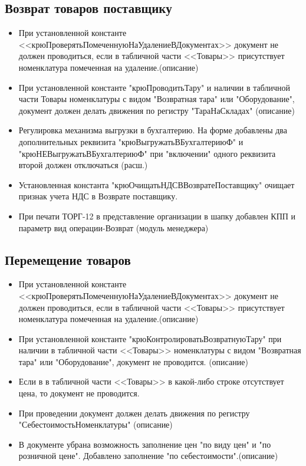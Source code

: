 \subsection{Возврат товаров поставщику}
\begin{itemize}
	\item При установленной константе <<крюПроверятьПомеченнуюНаУдалениеВДокументах>>
	документ не должен проводиться, если в табличной части <<Товары>> присутствует
	номенклатура помеченная на удаление.(описание)
	\item При установленной константе "крюПроводитьТару" и наличии в табличной части
	 Товары номенклатуры	с видом "Возвратная тара" или "Оборудование", документ должен делать движения по регистру "ТараНаСкладах" (описание)
	\item  Регулировка механизма выгрузки в бухгалтерию. На форме добавлены два дополнительных реквизита "крюВыгружатьВБухгалтериюФ" и "крюНЕВыгружатьВБухгалтериюФ" при "включении" одного реквизита второй должен отключаться
	 (расш.)
	\item Установленная константа "крюОчищатьНДСВВозвратеПоставщику" очищает признак учета НДС в Возврате поставщику.
	\item При печати ТОРГ-12 в представление организации в шапку добавлен КПП и параметр вид операции-Возврат (модуль менеджера)

\end{itemize}


\subsection{Перемещение товаров}

\begin{itemize}
	\item При установленной константе <<крюПроверятьПомеченнуюНаУдалениеВДокументах>>
	документ не должен проводиться, если в табличной части <<Товары>> присутствует
	номенклатура помеченная на удаление.(описание)
	\item При установленной константе "крюКонтролироватьВозвратнуюТару" при наличии в табличной части <<Товары>> номенклатуры
	с видом "Возвратная тара" или "Оборудование", документ не проводится. (описание)
	\item Если в в табличной части <<Товары>> в какой-либо строке отсутствует цена, то документ не проводится.
	\item При проведении документ должен делать движения по регистру "СебестоимостьНоменклатуры" (описание)
	\item В документе убрана возможность заполнение цен "по виду цен" и "по розничной цене". Добавлено заполнение "по себестоимости".(описание)
\end{itemize}



